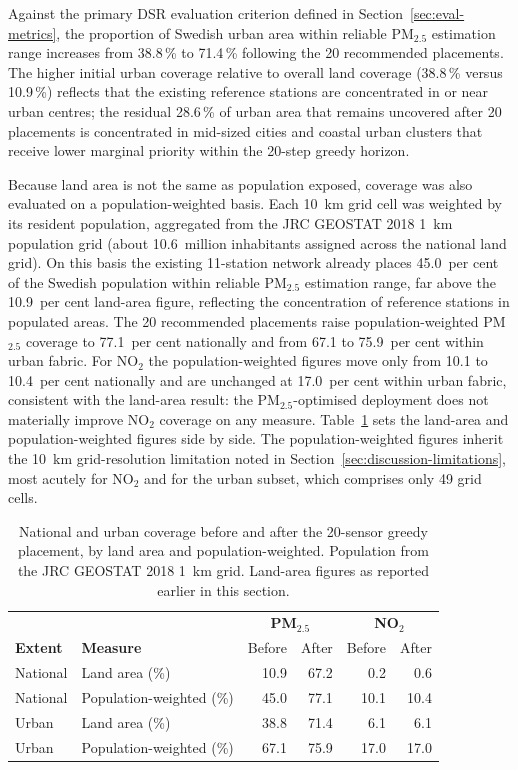 \documentclass[11pt,a4paper]{article}
\begin{document}
Against the primary DSR evaluation criterion defined in Section~\ref{sec:eval-metrics}, the proportion of Swedish urban area within reliable PM$_{2.5}$ estimation range increases from 38.8\,\% to 71.4\,\% following the 20 recommended placements. The higher initial urban coverage relative to overall land coverage (38.8\,\% versus 10.9\,\%) reflects that the existing reference stations are concentrated in or near urban centres; the residual 28.6\,\% of urban area that remains uncovered after 20 placements is concentrated in mid-sized cities and coastal urban clusters that receive lower marginal priority within the 20-step greedy horizon.

Because land area is not the same as population exposed, coverage was also evaluated on a population-weighted basis. Each 10~km grid cell was weighted by its resident population, aggregated from the JRC GEOSTAT 2018 1~km population grid (about 10.6~million inhabitants assigned across the national land grid). On this basis the existing 11-station network already places 45.0~per cent of the Swedish population within reliable PM$_{2.5}$ estimation range, far above the 10.9~per cent land-area figure, reflecting the concentration of reference stations in populated areas. The 20 recommended placements raise population-weighted PM$_{2.5}$ coverage to 77.1~per cent nationally and from 67.1 to 75.9~per cent within urban fabric. For NO$_2$ the population-weighted figures move only from 10.1 to 10.4~per cent nationally and are unchanged at 17.0~per cent within urban fabric, consistent with the land-area result: the PM$_{2.5}$-optimised deployment does not materially improve NO$_2$ coverage on any measure. Table~\ref{tab:population-coverage} sets the land-area and population-weighted figures side by side. The population-weighted figures inherit the 10~km grid-resolution limitation noted in Section~\ref{sec:discussion-limitations}, most acutely for NO$_2$ and for the urban subset, which comprises only 49 grid cells.

\begin{table}[ht]
\caption{National and urban coverage before and after the 20-sensor greedy placement, by land area and population-weighted. Population from the JRC GEOSTAT 2018 1~km grid. Land-area figures as reported earlier in this section.}
\label{tab:population-coverage}
\small
\centering
\begin{tabular}{llrrrr}
\hline
 & & \multicolumn{2}{c}{\textbf{PM$_{2.5}$}} & \multicolumn{2}{c}{\textbf{NO$_2$}} \\
\textbf{Extent} & \textbf{Measure} & Before & After & Before & After \\
\hline
National & Land area (\%)          & 10.9 & 67.2 & 0.2  & 0.6  \\
National & Population-weighted (\%) & 45.0 & 77.1 & 10.1 & 10.4 \\
Urban    & Land area (\%)          & 38.8 & 71.4 & 6.1  & 6.1  \\
Urban    & Population-weighted (\%) & 67.1 & 75.9 & 17.0 & 17.0 \\
\hline
\end{tabular}
\end{table}
\end{document}
